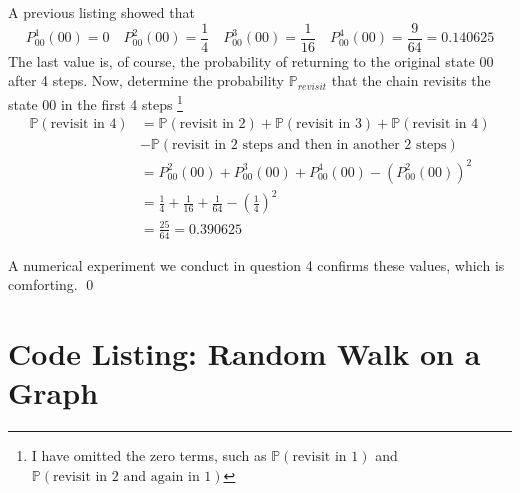 \documentclass[8pt,notitlepage]{report}
\newenvironment{solution}[1][Solution]{\begin{trivlist}
    \item[\hskip \labelsep {\bfseries #1}]}{\end{trivlist}}
\newcommand{\PP}{\mathbb{P}}
\begin{document}
\begin{solution}
A previous listing showed that
$$
	P^1_{00} (00) = 0 \quad
  	P^2_{00} (00) = \frac{1}{4} \quad
	P^3_{00} (00) = \frac{1}{16} \quad
	P^4_{00} (00) = \frac{9}{64} = 0.140625
$$
The last value is, of course, the probability of returning to the original state $00$ after 4 steps.
Now, determine the probability $\PP_{revisit}$ that the chain revisits the state $00$ in the first 4 steps
\footnote{I have omitted the zero terms, such as $\PP(\textrm{revisit in 1})$ and $\PP(\textrm{revisit in 2 and again in 1})$}
\begin{equation}
\begin{split}
	\PP(\textrm{revisit in 4}) &= \PP (\textrm{revisit in 2}) 
			+ \PP(\textrm{revisit in 3}) 
			+ \PP(\textrm{revisit in 4}) \\
			& - \PP(\textrm{revisit in 2 steps and then in another 2 steps}) \\
		 &= P^2_{00}(00) + P^3_{00}(00) + P^4_{00}(00) - (P^2_{00}(00))^2 \\
		 &= \frac{1}{4} + \frac{1}{16} + \frac{1}{64} - (\frac{1}{4})^2 \\
		 &= \frac{25}{64} = 0.390625
\end{split}
\end{equation}

A numerical experiment we conduct in question 4 confirms these values, which is comforting.
\qed
\end{solution}

\appendix
\section*{Code Listing: Random Walk on a Graph}
% 
\end{document}
